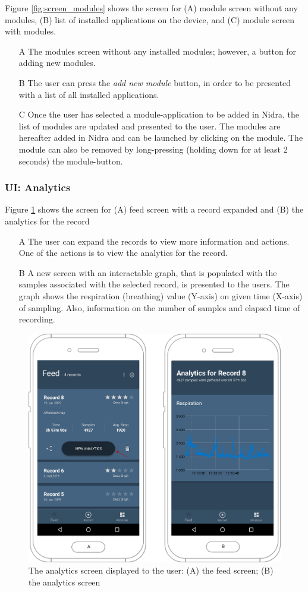 Figure \ref{fig:screen_modules} shows the screen for (A) module screen without any modules, (B) list of installed applications on the device, and (C) module screen with modules. 

\begin{itemize}
    \item[A] The modules screen without any installed modules; however, a button for adding new modules.
    \item[B] The user can press the \textit{add new module} button, in order to be presented with a list of all installed applications. 
    \item[C] Once the user has selected a module-application to be added in Nidra, the list of modules are updated and presented to the user. The modules are hereafter added in Nidra and can be launched by clicking on the module. The module can also be removed by long-pressing (holding down for at least 2 seconds) the module-button.
\end{itemize}

\subsubsection{UI: Analytics}
Figure \ref{fig:screen_analytics} shows the screen for (A) feed screen with a record expanded and (B) the analytics for the record

\begin{itemize}
    \item[A] The user can expand the records to view more information and actions. One of the actions is to view the analytics for the record.
    \item[B] A new screen with an interactable graph, that is populated with the samples associated with the selected record, is presented to the users. The graph shows the respiration (breathing) value (Y-axis) on given time (X-axis) of sampling. Also, information on the number of samples and elapsed time of recording. 
\end{itemize}

\begin{figure}[!h]
    \centering
    \includegraphics[scale=0.26]{images/Analytics_img.pdf}
    \caption{The analytics screen displayed to the user: (A) the feed screen; (B) the analytics screen}
    \label{fig:screen_analytics}
\end{figure}

